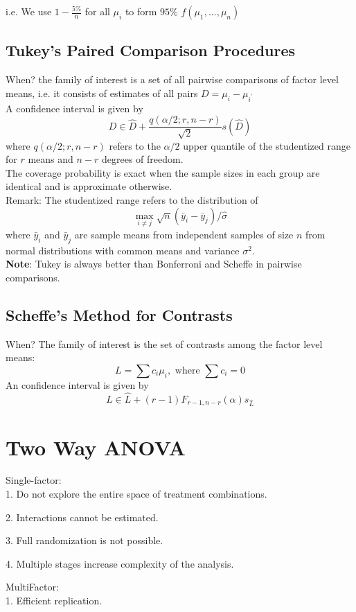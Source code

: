 \documentclass[11pt,a4paper]{article}
\begin{document}
i.e. We use $1-\frac{5\%}{n}$ for all $\mu_i$ to form $95\%$ $f(\mu_1,...,\mu_n)$


\subsection{Tukey’s Paired Comparison Procedures}
When? the family of interest is a set of all pairwise comparisons of factor level means, i.e. it consists of estimates of all pairs $D=\mu_{i}-\mu_{i^{\prime}}$\\
A confidence interval is given by
$$
D \in \hat{D}+\frac{q(\alpha / 2 ; r, n-r)}{\sqrt{2}} s(\hat{D})
$$
where $q(\alpha / 2 ; r, n-r)$ refers to the $\alpha / 2$ upper quantile of the studentized range for $r$ means and $n-r$ degrees of freedom.\\
The coverage probability is exact when the sample sizes in each group are identical and is approximate otherwise.\\
Remark: The studentized range refers to the distribution of
$$
\max _{i \neq j} \sqrt{n}\left(\bar{y}_{i}-\bar{y}_{j}\right) / \hat{\sigma}
$$
where $\bar{y}_{i}$ and $\bar{y}_{j}$ are sample means from independent samples of size $n$ from normal distributions with common means and variance $\sigma^{2}$.\\
\textbf{Note}: Tukey is always better than Bonferroni and Scheffe in pairwise comparisons.

\subsection{Scheffe’s Method for Contrasts}
When? The family of interest is the set of contrasts among the factor level means:
$$
L=\sum c_{i} \mu_{i}, \text { where } \sum c_{i}=0
$$
An confidence interval is given by
$$
L \in \hat{L}+(r-1) F_{r-1, n-r}(\alpha) s_{\hat{L}}
$$


\section{Two Way ANOVA}
Single-factor:\\
1. Do not explore the entire space of treatment combinations.

2. Interactions cannot be estimated.

3. Full randomization is not possible.

4. Multiple stages increase complexity of the analysis.

MultiFactor:\\
1. Eﬃcient replication.
\end{document}
